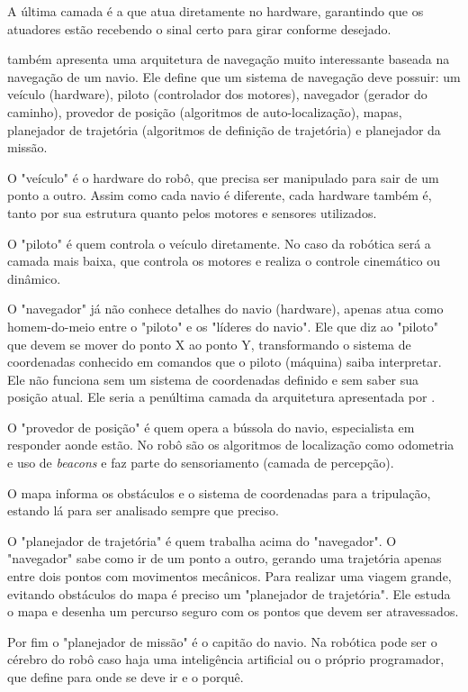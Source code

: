A última camada é a que atua diretamente no hardware, garantindo que os atuadores estão recebendo o sinal certo para girar conforme desejado.

\cite{Bagnall2011} também apresenta uma arquitetura de navegação muito interessante baseada na navegação de um navio. Ele define que um sistema de navegação deve possuir: um veículo (hardware), piloto (controlador dos motores), navegador (gerador do caminho), provedor de posição (algoritmos de auto-localização), mapas, planejador de trajetória (algoritmos de definição de trajetória)  e planejador da missão.

O "veículo" é o hardware do robô, que precisa ser manipulado para sair de um ponto a outro. Assim como cada navio é diferente, cada hardware também é, tanto por sua estrutura quanto pelos motores e sensores utilizados.

O "piloto" é quem controla o veículo diretamente. No caso da robótica será a camada mais baixa, que controla os motores e realiza o controle cinemático ou dinâmico.

O "navegador" já não conhece detalhes do navio (hardware), apenas atua como homem-do-meio entre o "piloto" e os "líderes do navio". Ele que diz ao "piloto" que devem se mover do ponto X ao ponto Y, transformando o sistema de coordenadas conhecido em comandos que o piloto (máquina) saiba interpretar. Ele não funciona sem um sistema de coordenadas definido e sem saber sua posição atual. Ele seria a penúltima camada da arquitetura apresentada por \cite{Vieira2005}.

O "provedor de posição" é quem opera a bússola do navio, especialista em responder aonde estão. No robô são os algoritmos de localização como odometria e uso de \textit{beacons} e faz parte do sensoriamento (camada de percepção).

O mapa informa os obstáculos e o sistema de coordenadas para a tripulação, estando lá para ser analisado sempre que preciso.

O "planejador de trajetória" é quem trabalha acima do "navegador". O "navegador" sabe como ir de um ponto a outro, gerando uma trajetória apenas entre dois pontos com movimentos mecânicos. Para realizar uma viagem grande, evitando obstáculos do mapa é preciso um "planejador de trajetória". Ele estuda o mapa e desenha um percurso seguro com os pontos que devem ser atravessados.

Por fim o "planejador de missão" é o capitão do navio. Na robótica pode ser o cérebro do robô caso haja uma inteligência artificial ou o próprio programador, que define para onde se deve ir e o porquê.

